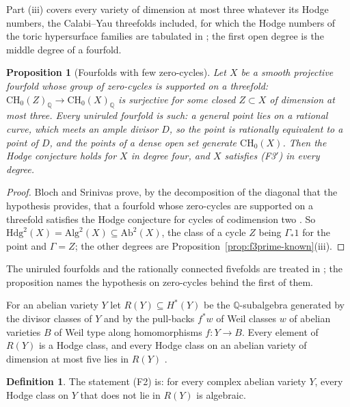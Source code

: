 \documentclass[11pt,reqno]{amsart}
\makeatletter
\renewcommand\subsection{\@startsection{subsection}{2}\z@{.6\linespacing\@plus.7\linespacing}{.3\linespacing}{\normalfont\bfseries}}
\numberwithin{equation}{section}
\theoremstyle{plain}
\newtheorem{proposition}[theorem]{Proposition}
\theoremstyle{definition}
\newtheorem{definition}[theorem]{Definition}
\newcommand{\QQ}{\mathbb{Q}}
\newcommand{\Hdg}{\mathrm{Hdg}}
\newcommand{\Ab}{\mathrm{Ab}}
\newcommand{\Alg}{\mathrm{Alg}}
\newcommand{\Fii}{\texorpdfstring{\textup{(F2)}}{(F2)}}
\newcommand{\Fiii}{\texorpdfstring{\textup{(F3$'$)}}{(F3')}}
\makeatother
\begin{document}
Part (iii) covers every variety of dimension at most three whatever its Hodge numbers, the Calabi--Yau threefolds included, for which the Hodge numbers of the toric hypersurface families are tabulated in \cite{Bha26a}; the first open degree is the middle degree of a fourfold.

\begin{proposition}[Fourfolds with few zero-cycles]\label{prop:fourfold}
Let $X$ be a smooth projective fourfold whose group of zero-cycles is supported on a threefold: $\mathrm{CH}_{0}(Z)_{\QQ}\to\mathrm{CH}_{0}(X)_{\QQ}$ is surjective for some closed $Z\subset X$ of dimension at most three. Every uniruled fourfold is such: a general point lies on a rational curve, which meets an ample divisor $D$, so the point is rationally equivalent to a point of $D$, and the points of a dense open set generate $\mathrm{CH}_{0}(X)$. Then the Hodge conjecture holds for $X$ in degree four, and $X$ satisfies \Fiii{} in every degree.
\end{proposition}

\begin{proof}
Bloch and Srinivas prove, by the decomposition of the diagonal that the hypothesis provides, that a fourfold whose zero-cycles are supported on a threefold satisfies the Hodge conjecture for cycles of codimension two \cite[Thm.~1]{BS83}. So $\Hdg^{2}(X)=\Alg^{2}(X)\subseteq\Ab^{2}(X)$, the class of a cycle $Z$ being $\Gamma_{*}1$ for the point and $\Gamma=Z$; the other degrees are Proposition~\ref{prop:f3prime-known}(iii).
\end{proof}

The uniruled fourfolds and the rationally connected fivefolds are treated in \cite{BMB26}; the proposition names the hypothesis on zero-cycles behind the first of them.


\subsection{The statement \Fii{}}

For an abelian variety $Y$ let $R(Y)\subseteq H^{*}(Y)$ be the $\QQ$-subalgebra generated by the divisor classes of $Y$ and by the pull-backs $f^{*}w$ of Weil classes $w$ of abelian varieties $B$ of Weil type along homomorphisms $f\colon Y\to B$. Every element of $R(Y)$ is a Hodge class, and every Hodge class on an abelian variety of dimension at most five lies in $R(Y)$ \cite{MZ99}.

\begin{definition}\label{def:f2}
The statement \Fii{} is: for every complex abelian variety $Y$, every Hodge class on $Y$ that does not lie in $R(Y)$ is algebraic.
\end{definition}
\end{document}
